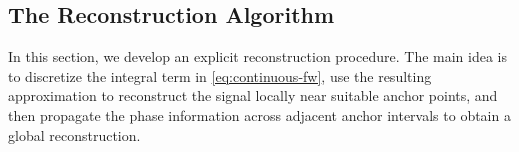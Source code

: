 \documentclass[11pt, reqno]{amsart}
\newcommand{\Z}{\mathbb{Z}}
\newcommand{\R}{\mathbb{R}}
\numberwithin{equation}{section}
\begin{document}





     
\subsection{The Reconstruction Algorithm} 
In this section, we develop an explicit reconstruction procedure. The main idea is to discretize the integral term in \eqref{eq:continuous-fw}, use the resulting approximation to reconstruct the signal locally near suitable anchor points, and then propagate the phase information across adjacent anchor intervals to obtain a global reconstruction.

\end{document}
